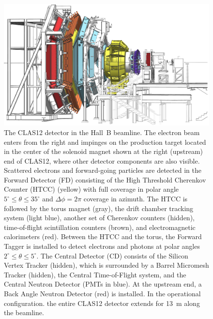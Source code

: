 \documentclass[final,3p,twocolumn]{elsarticle}
\begin{document}
\begin{figure}[t]
\centering
\centerline{\includegraphics[width=1.8\columnwidth]{CLAS12-side-3.png}}
\caption{The CLAS12 detector in the Hall~B beamline. The electron beam enters from the right and impinges on
  the production target located in the center of the solenoid magnet shown at the right (upstream) end of CLAS12,
  where other detector components are also visible. Scattered electrons and forward-going particles are detected
  in the Forward Detector (FD) consisting of the High Threshold Cherenkov Counter (HTCC) (yellow) with full coverage
  in polar angle $5^\circ \le \theta \le 35^\circ$ and $\Delta \phi = 2\pi$ coverage in azimuth. The HTCC is followed
  by the torus magnet (gray), the drift chamber tracking system (light blue), another set of Cherenkov counters (hidden),
  time-of-flight scintillation counters (brown), and electromagnetic calorimeters (red). Between the HTCC and the
  torus, the Forward Tagger is installed to detect electrons and photons at polar angles $2^\circ \le \theta \le 5^\circ$.
  The Central Detector (CD) consists of the Silicon Vertex Tracker (hidden), which is surrounded by a Barrel Micromesh
  Tracker (hidden), the Central Time-of-Flight system, and the Central Neutron Detector (PMTs in blue). At the upstream
  end, a Back Angle Neutron Detector (red) is installed. In the operational configuration. the entire CLAS12 detector
  extends for 13~m along the beamline.} 
\label{clas12}
\end{figure}
\end{document}
